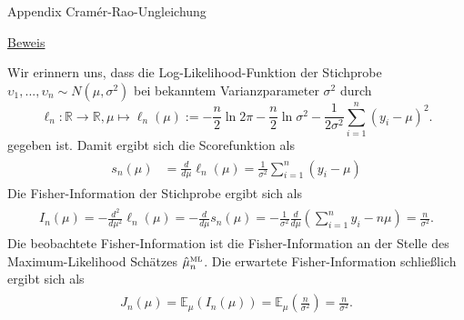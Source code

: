 \documentclass[
  8pt,
  ignorenonframetext,
]{beamer}
\newcommand{\ups} {\upsilon}
\begin{document}
\begin{frame}{Appendix \textbar{} Cramér-Rao-Ungleichung}
\protect\hypertarget{appendix-cramuxe9r-rao-ungleichung-12}{}
\footnotesize

\underline{Beweis}

Wir erinnern uns, dass die Log-Likelihood-Funktion der Stichprobe
\(\ups_1,...,\ups_n \sim N(\mu,\sigma^2)\) bei bekanntem
Varianzparameter \(\sigma^2\) durch \begin{equation}
\ell_n : \mathbb{R} \to \mathbb{R},
\mu \mapsto \ell_n(\mu)
:= -\frac{n}{2} \ln 2\pi - \frac{n}{2} \ln \sigma^2  - \frac{1}{2\sigma^2}\sum_{i=1}^n(y_i-\mu)^2.
\end{equation} gegeben ist. Damit ergibt sich die Scorefunktion als
\begin{align}
\begin{split}
s_n(\mu)
&  = \frac{d}{d\mu}\ell_n(\mu)
= \frac{1}{\sigma^2}\sum_{i=1}^n(y_i-\mu)
\end{split}
\end{align} Die Fisher-Information der Stichprobe ergibt sich als
\begin{align}
\begin{split}
I_n(\mu)
 = -\frac{d^2}{d\mu^2}\ell_n(\mu)
= -\frac{d}{d\mu}s_n(\mu)
= -\frac{1}{\sigma^2}\frac{d}{d\mu}\left(\sum_{i=1}^n y_i -  n\mu \right)
= \frac{n}{\sigma^2}.
\end{split}
\end{align} Die beobachtete Fisher-Information ist die
Fisher-Information an der Stelle des Maximum-Likelihood Schätzes
\(\hat{\mu}^{\mbox{\tiny ML}}_n\). Die erwartete Fisher-Information
schließlich ergibt sich als \begin{align}
\begin{split}
J_n(\mu)
= \mathbb{E}_\mu(I_n(\mu))
= \mathbb{E}_\mu\left(\frac{n}{\sigma^2}\right)
= \frac{n}{\sigma^2}.
\end{split}
\end{align}
\end{frame}
\end{document}
